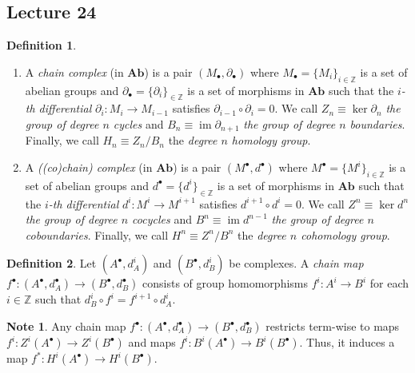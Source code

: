 \documentclass[10pt,letterpaper,cm]{nupset}
\theoremstyle{definition}
\newtheorem*{definition}{Definition}
\newtheorem{note}{Note}
\newcommand{\Z}{\mathbb Z}
\newcommand{\1}{\mathbf{1}}
\newcommand{\0}{\vec 0}
\DeclareMathOperator{\im}{im}
\begin{document}
\subsection{Lecture 24}

\begin{definition} $ $
\begin{enumerate}
\item  A \textit{chain complex} (in $\mathbf{Ab}$) is a pair $(M_{\bullet}, \partial_{\bullet})$ where $M_{\bullet} = \{M_i\}_{i\in \Z}$ is a set of abelian groups and $\partial_{\bullet} =\{\partial_i\}_{\in \Z}$ is a set of morphisms in $\mathbf{Ab}$ such that the \textit{$i$-th differential} $\partial_i : M_i \to M_{i-1}$ satisfies $\partial_{i-1} \circ \partial_i = 0$. We call $Z_n \equiv \ker{\partial_{n}}$ \textit{the group of degree $n$ cycles} and $B_n \equiv \im{\partial_{n+1}}$ \textit{the group of degree $n$ boundaries}. Finally, we call $H_n \equiv Z_n/B_n$ the \textit{degree $n$ homology group}.
\item A \textit{((co)chain) complex} (in $\mathbf{Ab}$) is a pair $(M^{\bullet}, d^{\bullet})$ where $M^{\bullet} = \{M^i\}_{i\in \Z}$ is a set of abelian groups and $d^{\bullet} =\{d^i\}_{\in \Z}$ is a set of morphisms in $\mathbf{Ab}$ such that the \textit{$i$-th differential} $d^i : M^i \to M^{i+1}$ satisfies $d^{i+1} \circ d^i = 0$. We call $Z^n \equiv \ker{d^n}$ \textit{the group of degree $n$ cocycles} and $B^n \equiv \im{d^{n-1}}$ \textit{the group of degree $n$ coboundaries}. Finally, we call $H^n \equiv Z^n/B^n$ the \textit{degree $n$ cohomology group}.
\end{enumerate}
\end{definition}

\begin{definition} Let $(A^{\bullet}, d_A^i)$ and $(B^{\bullet}, d_B^i)$ be complexes.
 A \textit{chain map} $f^{\bullet} : (A^{\bullet}, d_A^{\bullet}) \to (B^{\bullet}, d_B^{\bullet})$ consists of group homomorphisms $f^i : A^i \to B^i$ for each $i\in \Z$ such that $d_B^i \circ f^i = f^{i+1} \circ d^i_A$. 
\end{definition}

\begin{note}
Any chain map $f^{\bullet}: (A^{\bullet}, d_A^{\bullet}) \to (B^{\bullet}, d_B^{\bullet})$ restricts term-wise to maps $f^i :Z^i(A^{\bullet}) \to Z^i(B^{\bullet})$ and maps $f^i : B^i(A^{\bullet}) \to B^i(B^{\bullet})$. Thus, it induces a map $f^{\ast} : H^i(A^{\bullet}) \to H^i(B^{\bullet})$.
\end{note}
\end{document}
